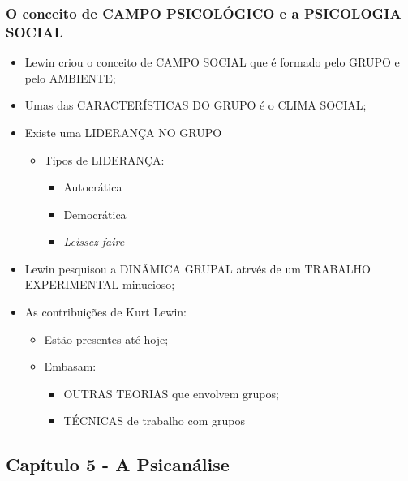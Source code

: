 \documentclass[
]{book}
\providecommand{\tightlist}{%
  \setlength{\itemsep}{0pt}\setlength{\parskip}{0pt}}
\begin{document}
\hypertarget{o-conceito-de-campo-psicoluxf3gico-e-a-psicologia-social}{%
\subsubsection{O conceito de CAMPO PSICOLÓGICO e a PSICOLOGIA
SOCIAL}\label{o-conceito-de-campo-psicoluxf3gico-e-a-psicologia-social}}

\begin{itemize}
\tightlist
\item
  Lewin criou o conceito de CAMPO SOCIAL que é formado pelo GRUPO e pelo
  AMBIENTE;
\item
  Umas das CARACTERÍSTICAS DO GRUPO é o CLIMA SOCIAL;
\item
  Existe uma LIDERANÇA NO GRUPO

  \begin{itemize}
  \tightlist
  \item
    Tipos de LIDERANÇA:

    \begin{itemize}
    \tightlist
    \item
      Autocrática
    \item
      Democrática
    \item
      \emph{Leissez-faire}
    \end{itemize}
  \end{itemize}
\item
  Lewin pesquisou a DINÂMICA GRUPAL atrvés de um TRABALHO EXPERIMENTAL
  minucioso;
\item
  As contribuições de Kurt Lewin:

  \begin{itemize}
  \tightlist
  \item
    Estão presentes até hoje;
  \item
    Embasam:

    \begin{itemize}
    \tightlist
    \item
      OUTRAS TEORIAS que envolvem grupos;
    \item
      TÉCNICAS de trabalho com grupos
    \end{itemize}
  \end{itemize}
\end{itemize}

\hypertarget{capuxedtulo-5---a-psicanuxe1lise}{%
\subsection{Capítulo 5 - A
Psicanálise}\label{capuxedtulo-5---a-psicanuxe1lise}}
\end{document}
